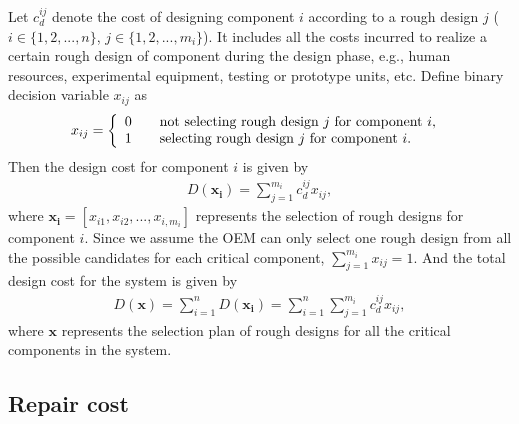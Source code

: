 \documentclass[10pt,a4paper]{article}
\begin{document}
	Let $c^{ij}_{d}$ denote the cost of designing component $i$ according to a rough design $j$ ($i \in \{1,2,...,n\}$, $j \in \{1,2,...,m_i\}$). It includes all the costs incurred to realize a certain rough design of component during the design phase, e.g., human resources, experimental equipment, testing or prototype units, etc. Define binary decision variable $x_{ij}$ as
	\[ x_{ij} = \left \{
	  \begin{array} {l l}
		0 & \quad \text {not selecting rough design $j$ for component $i$, } \\
		1 & \quad \text {selecting rough design $j$ for component $i$. }
		\end {array} \right.\]
		Then the design cost for component $i$ is given by
	 \begin{eqnarray}
	D(\boldsymbol{x_{i}})=\sum^{m_{i}}_{j=1} {c^{ij}_{d} x_{ij}},
		 \end{eqnarray}
		 where $\boldsymbol{x_{i}}=[x_{i1},x_{i2},...,x_{i,m_i}]$ represents the selection of rough designs for component $i$. Since we assume the OEM can only select one rough design from all the possible candidates for each critical component, $\sum^{m_{i}}_{j=1}{x_{ij}=1}$.
And the total design cost for the system is given by
\begin{eqnarray}
	D(\boldsymbol{x})=\sum ^{n}_{i=1}D(\boldsymbol{x_{i}})=\sum ^{n}_{i=1}\sum^{m_{i}}_{j=1} {c^{ij}_{d} x_{ij}},
\end{eqnarray}
where $\boldsymbol{x}$ represents the selection plan of rough designs for all the critical components in the system.
	
	\subsection{Repair cost}
	
\end{document}
